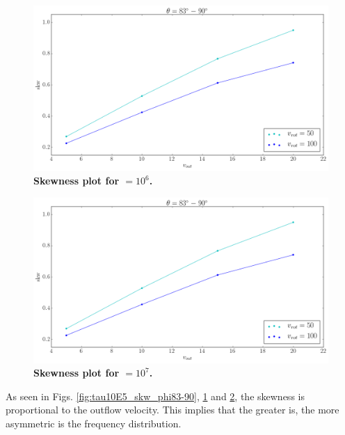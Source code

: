 \begin{figure}[h!]
	\begin{center}
		\includegraphics[width=1\textwidth]{./figures/chapter3/tau10E6_skw_phi83-90}
	\end{center}
	\caption{\textbf{Skewness plot for \tauh$=10^6$.} 
		\label{fig:tau10E6_skw_phi83-90}}
\end{figure}

\begin{figure}[h!]
	\begin{center}
		\includegraphics[width=1\textwidth]{./figures/chapter3/tau10E6_skw_phi83-90}
	\end{center}
	\caption{\textbf{Skewness plot for \tauh$=10^7$.} 
		\label{fig:tau10E7_skw_phi83-90}}
\end{figure}

As seen in Figs. \ref{fig:tau10E5_skw_phi83-90}, \ref{fig:tau10E6_skw_phi83-90} and \ref{fig:tau10E7_skw_phi83-90}, the skewness is proportional to the outflow velocity. This implies that the greater \vout is, the more asymmetric is the \lya frequency distribution.\\

